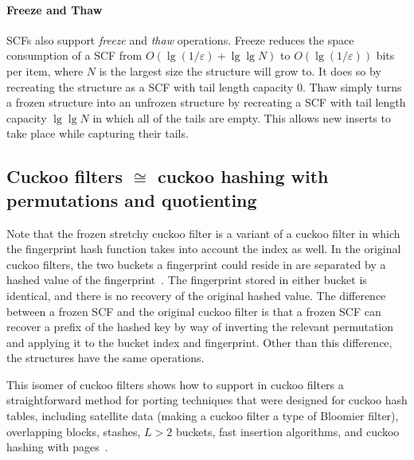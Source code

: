 \documentclass[letterpaper,twocolumn,10pt]{article}
\newcommand{\taffy}{stretchy}
\newcommand{\TCF}{SCF}
\newcommand{\taffy}{taffy}
\newcommand{\TCF}{TCF}
\begin{document}
\paragraph{Freeze and Thaw}
\TCF{}s also support {\em freeze} and {\em thaw} operations.
Freeze reduces the space consumption of a \TCF{} from $O(\lg(1/\varepsilon) + \lg \lg N)$ to $O(\lg (1 / \varepsilon))$ bits per item, where $N$ is the largest size the structure will grow to.
It does so by recreating the structure as a \TCF{} with tail length capacity $0$.
Thaw simply turns a frozen structure into an unfrozen structure by recreating a \TCF{} with tail length capacity $\lg \lg N$ in which all of the tails are empty.
This allows new inserts to take place while capturing their tails.

\subsection{Cuckoo filters $\cong$ cuckoo hashing with permutations and quotienting}
\label{dictionary}

Note that the frozen \taffy{} cuckoo filter is a variant of a cuckoo filter in which the fingerprint hash function takes into account the index as well.
In the original cuckoo filters, the two buckets a fingerprint could reside in are separated by a hashed value of the fingerprint~\cite{cuckoo}.
The fingerprint stored in either bucket is identical, and there is no recovery of the original hashed value.
The difference between a frozen \TCF{} and the original cuckoo filter is that a frozen \TCF{} can recover a prefix of the hashed key by way of inverting the relevant permutation and applying it to the bucket index and fingerprint.
Other than this difference, the structures have the same operations.

This isomer of cuckoo filters shows how to support in cuckoo filters a straightforward method for porting techniques that were designed for cuckoo hash tables, including satellite data (making a cuckoo filter a type of Bloomier filter), overlapping blocks, stashes, $L > 2$ buckets, fast insertion algorithms, and cuckoo hashing with pages~\cite{cuckoo-simple,cuckoo-overlap,stash,d-ary,d-ary-filter,vertical,bloomier,cuckoo-linear-insertion,cuckoo-simd-insert,cuckoo-pages,cuckoo-pages-non-contiguous}.


\end{document}
